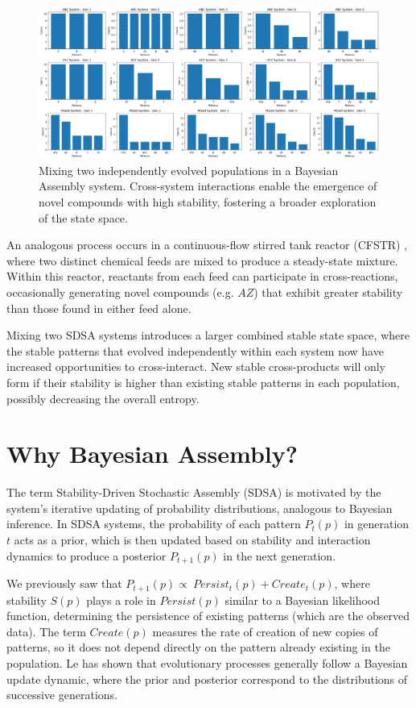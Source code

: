 \documentclass[preprint,12pt]{elsarticle}
\begin{document}
\begin{figure}[htp]
    \centering
    \includegraphics[width=13cm]{figure_3}
    \caption{Mixing two independently evolved populations in a Bayesian Assembly system. Cross-system interactions enable the emergence of novel compounds with high stability, fostering a broader exploration of the state space.}
    \label{fig:figure_3}
\end{figure}

An analogous process occurs in a continuous-flow stirred tank reactor (CFSTR) \cite{fogler1999chemical}, where two distinct chemical feeds are mixed to produce a steady-state mixture. Within this reactor, reactants from each feed can participate in cross-reactions, occasionally generating novel compounds (e.g. \( AZ \)) that exhibit greater stability than those found in either feed alone. 

Mixing two SDSA systems introduces a larger combined stable state space, where the stable patterns that evolved independently within each system now have increased opportunities to cross-interact. New stable cross-products will only form if their stability is higher than existing stable patterns in each population, possibly decreasing the overall entropy.

\section{Why Bayesian Assembly?}

The term Stability-Driven Stochastic Assembly (SDSA) is motivated by the system's iterative updating of probability distributions, analogous to Bayesian inference. In SDSA systems, the probability of each pattern \( P_t(p) \) in generation \( t \) acts as a prior, which is then updated based on stability and interaction dynamics to produce a posterior \( P_{t+1}(p) \) in the next generation. 

We previously saw that $P_{t+1}(p) \propto\ Persist_t(p) + Create_t(p)$, where stability \( S(p) \) plays a role in $Persist(p)$ similar to a Bayesian likelihood function, determining the persistence of existing patterns (which are the observed data). The term $Create(p)$ measures the rate of creation of new copies of patterns, so it does not depend directly on the pattern already existing in the population. Le \cite{le2020equation} has shown that evolutionary processes generally follow a Bayesian update dynamic, where the prior and posterior correspond to the distributions of successive generations. 
\end{document}
